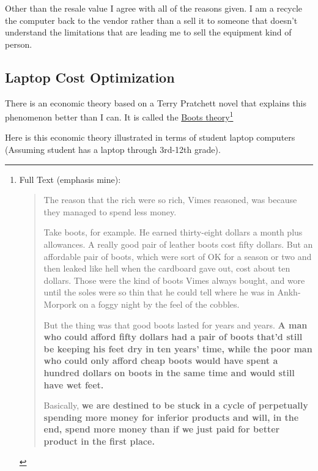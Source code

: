 \documentclass[14pt, letterpaper,twoside]{extreport}
\begin{document}
Other than the resale value I agree with all of the reasons given. I am a recycle the computer back to the vendor rather than a sell it to someone that doesn't understand the limitations that are leading me to sell the equipment kind of person.

\pagebreak \hypertarget{optimizing-cost-with-performance}{%
    \subsection*{Laptop Cost Optimization}\label{optimizing-cost-with-performance}}



There is an economic theory based on a Terry Pratchett novel that explains this phenomenon better than I can. It is called the \href{https://en.wikipedia.org/wiki/Boots_theory}{Boots theory}\footnote{Full Text (emphasis mine):
    \begin{quote}The reason that the rich were so rich, Vimes reasoned, was because they managed to spend less money.
        
        Take boots, for example. He earned thirty-eight dollars a month plus allowances. A really good pair of leather boots cost fifty dollars. But an affordable pair of boots, which were sort of OK for a season or two and then leaked like hell when the cardboard gave out, cost about ten dollars. Those were the kind of boots Vimes always bought, and wore until the soles were so thin that he could tell where he was in Ankh-Morpork on a foggy night by the feel of the cobbles.
        
        But the thing was that good boots lasted for years and years. \textbf{A man who could afford fifty dollars had a pair of boots that’d still be keeping his feet dry in ten years’ time, while the poor man who could only afford cheap boots would have spent a hundred dollars on boots in the same time and would still have wet feet.}
        
        Basically, \textbf{we are destined to be stuck in a cycle of perpetually spending more money for inferior products and will, in the end, spend more money than if we just paid for better product in the first place.}
    \end{quote} }

\hfill \break Here is this economic theory illustrated in terms of student laptop computers (Assuming student has a laptop through 3rd-12th grade).
\end{document}
